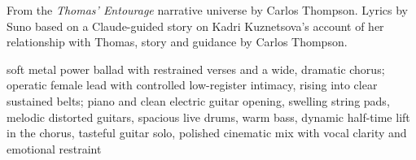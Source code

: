 
\begin{notes}
From the \emph{Thomas' Entourage} narrative universe by Carlos Thompson. Lyrics by Suno based on a Claude-guided story on Kadri Kuznetsova's account of her relationship with Thomas, story and guidance by Carlos Thompson.
\end{notes}
\begin{style}
soft metal power ballad with restrained verses and a wide, dramatic chorus; operatic female lead with controlled low-register intimacy, rising into clear sustained belts; piano and clean electric guitar opening, swelling string pads, melodic distorted guitars, spacious live drums, warm bass, dynamic half-time lift in the chorus, tasteful guitar solo, polished cinematic mix with vocal clarity and emotional restraint
\end{style}
